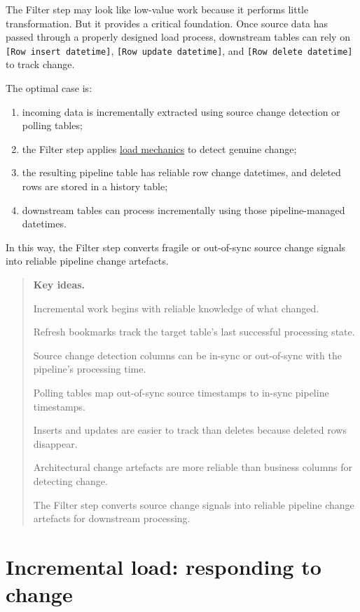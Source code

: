 \documentclass[10pt,openany,10pt]{book}
\providecommand{\tightlist}{%
  \setlength{\itemsep}{0pt}\setlength{\parskip}{0pt}}
\begin{document}
The Filter step may look like low-value work because it performs little
transformation. But it provides a critical foundation. Once source data
has passed through a properly designed load process, downstream tables
can rely on \texttt{{[}Row\ insert\ datetime{]}},
\texttt{{[}Row\ update\ datetime{]}}, and
\texttt{{[}Row\ delete\ datetime{]}} to track change.

The optimal case is:

\begin{enumerate}
\def\labelenumi{\arabic{enumi}.}
\tightlist
\item
  incoming data is incrementally extracted using source change detection
  or polling tables;
\item
  the Filter step applies
  \hyperref[docs-efficient-stable-pipeline-load-mechanics]{load
  mechanics} to detect genuine change;
\item
  the resulting pipeline table has reliable row change datetimes, and
  deleted rows are stored in a history table;
\item
  downstream tables can process incrementally using those
  pipeline-managed datetimes.
\end{enumerate}

In this way, the Filter step converts fragile or out-of-sync source
change signals into reliable pipeline change artefacts.

\begin{quote}
\textbf{Key ideas.}

Incremental work begins with reliable knowledge of what changed.

Refresh bookmarks track the target table's last successful processing
state.

Source change detection columns can be in-sync or out-of-sync with the
pipeline's processing time.

Polling tables map out-of-sync source timestamps to in-sync pipeline
timestamps.

Inserts and updates are easier to track than deletes because deleted
rows disappear.

Architectural change artefacts are more reliable than business columns
for detecting change.

The Filter step converts source change signals into reliable pipeline
change artefacts for downstream processing.
\end{quote}

\newpage

\chapter{Incremental load: responding to
change}\label{docs-efficient-stable-pipeline-responding-to-change}
\end{document}
